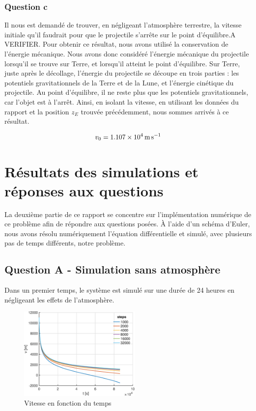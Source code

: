 \documentclass[a4paper,12pt,twoside]{article}
\begin{document}
\subsubsection*{Question c}
Il nous est demandé de trouver, en négligeant l'atmosphère terrestre, la vitesse initiale qu'il faudrait pour que le projectile s'arrête sur le point d'équilibre.A VERIFIER.
Pour obtenir ce résultat, nous avons utilisé la conservation de l'énergie mécanique.
Nous avons donc considéré l'énergie mécanique du projectile lorsqu'il se trouve sur Terre, et lorsqu'il atteint le point d'équilibre.
Sur Terre, juste après le décollage, l'énergie du projectile se découpe en trois parties :
les potentiels gravitationnels de la Terre et de la Lune, et l'énergie cinétique du projectile.
Au point d'équilibre, il ne reste plus que les potentiels gravitationnels, car l'objet est à l'arrêt.
Ainsi, en isolant la vitesse, en utilisant les données du rapport et la position $z_E$ trouvée précédemment, nous sommes arrivés à ce résultat.

\begin{equation}
    v_0 = \SI{1.107d4}{\meter\per\second}
    \label{val:v0}
\end{equation}


\section{Résultats des simulations et réponses aux questions}
La deuxième partie de ce rapport se concentre sur l'implémentation numérique de ce problème afin de répondre aux questions posées.
À l'aide d'un schéma d'Euler, nous avons résolu numériquement l'équation différentielle et simulé, avec plusieurs pas de temps différents, notre problème.

\subsection{Question A - Simulation sans atmosphère}
Dans un premier temps, le système est simulé sur une durée de 24 heures en négligeant les effets de l'atmosphère.

\begin{figure}[h]
	\centering
    \includegraphics[width=0.53\textwidth]{graphs/vA.eps}
    \caption{Vitesse en fonction du temps}
    \label{fig:A-vt}
\end{figure}
\end{document}
